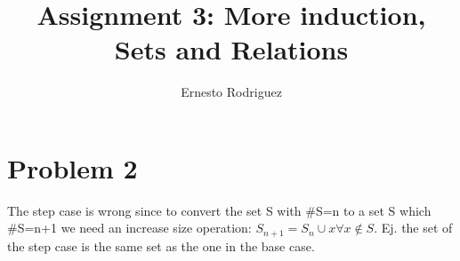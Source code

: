 \documentclass{article}
\title{Assignment 3: More induction, Sets and Relations}
\author{Ernesto Rodriguez}
\begin{document}
\maketitle

\section{Problem 2}

The step case is wrong since to convert the set S with \#S=n to a set S which \#S=n+1 we need an increase size operation: $S_{n+1}=S_{n} \cup {x} \forall x \notin S$. Ej. the set of the step case is the same set as the one in the base case.
\end{document}
